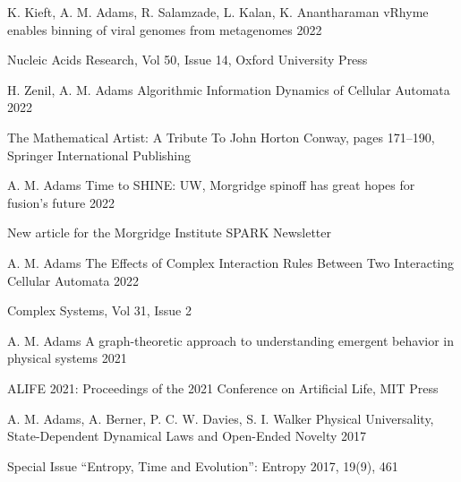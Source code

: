\begin{cventries}
\cventry
    {K. Kieft, \textcolor{cmyk-magenta}{A. M. Adams}, R. Salamzade, L. Kalan, K. Anantharaman}
    {vRhyme enables binning of viral genomes from metagenomes}
    {}
    {2022}
    {
    \begin{cvitems}
        \item {Nucleic Acids Research, Vol 50, Issue 14, Oxford University Press}
    \end{cvitems}
    }
    
\cventry
    {H. Zenil, \textcolor{cmyk-magenta}{A. M. Adams}}
    {Algorithmic Information Dynamics of Cellular Automata}
    {}
    {2022}
    {
    \begin{cvitems}
        \item {The Mathematical Artist: A Tribute To John Horton Conway, pages 171--190, Springer International Publishing}
    \end{cvitems}
    }
    
\cventry
    {\textcolor{cmyk-magenta}{A. M. Adams}}
    {Time to SHINE: UW, Morgridge spinoff has great hopes for fusion’s future}
    {}
    {2022}
    {
    \begin{cvitems}
        \item {New article for the Morgridge Institute SPARK Newsletter}
    \end{cvitems}
    }
    
\cventry
    {\textcolor{cmyk-magenta}{A. M. Adams}}
    {The Effects of Complex Interaction Rules Between Two Interacting Cellular Automata}
    {}
    {2022}
    {
    \begin{cvitems}
        \item {Complex Systems, Vol 31, Issue 2}
    \end{cvitems}
    }
    
\cventry
    {\textcolor{cmyk-magenta}{A. M. Adams}}
    {A graph-theoretic approach to understanding emergent behavior in physical systems}
    {}
    {2021}
    {
    \begin{cvitems}
        \item {ALIFE 2021: Proceedings of the 2021 Conference on Artificial Life, MIT Press}
    \end{cvitems}
    }
    
\cventry
    {\textcolor{cmyk-magenta}{A. M. Adams}, A. Berner, P. C. W. Davies, S. I. Walker}
    {Physical Universality, State-Dependent Dynamical Laws and Open-Ended Novelty}
    {}
    {2017}
    {
    \begin{cvitems}
        \item {Special Issue ``Entropy, Time and Evolution'': Entropy 2017, 19(9), 461}
    \end{cvitems}
    }
    

\end{cventries}
